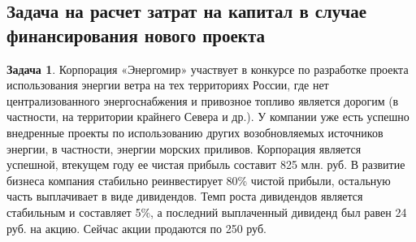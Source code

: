 \documentclass[a4paper, 14pt]{article}
\theoremstyle{plain} %
\theoremstyle{definition} %
\newtheorem{problem}{Задача}[subsection]
\theoremstyle{remark} %
\begin{document}
\subsection{Задача на расчет затрат на капитал в случае финансирования нового проекта}
\begin{problem}
	Корпорация  «Энергомир»  участвует  в  конкурсе  по  разработке  проекта использования энергии  ветра  на  тех  территориях  России,  где  нет централизованного энергоснабжения и привозное топливо является дорогим (в частности, на территории крайнего  Севера  и  др.).  У  компании  уже  есть  успешно  внедренные  проекты  по использованию других возобновляемых источников энергии, в частности, энергии морских приливов. Корпорация является успешной, втекущем году ее чистая прибыль составит 825 млн. руб. В развитие бизнеса компания стабильно реинвестирует 80\% чистой прибыли, остальную  часть  выплачивает  в  виде  дивидендов.  Темп  роста  дивидендов  является стабильным и составляет 5\%, а последний выплаченный дивиденд был равен 24 руб. на акцию. Сейчас акции продаются по 250 руб.


\end{problem}
\end{document}
